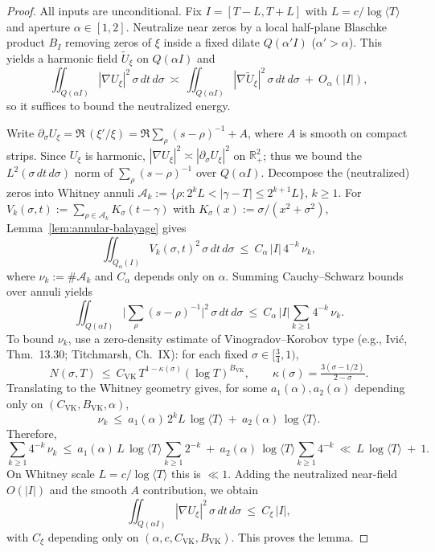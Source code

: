 \documentclass[11pt]{article}
\theoremstyle{definition}
\theoremstyle{remark}
\newcommand{\R}{\mathbb{R}}
\begin{document}
\begin{proof}
All inputs are unconditional. Fix $I=[T-L,T+L]$ with $L=c/\log\langle T\rangle$ and aperture $\alpha\in[1,2]$. Neutralize near zeros by a local half-plane Blaschke product $B_I$ removing zeros of $\xi$ inside a fixed dilate $Q(\alpha'I)$ ($\alpha'>\alpha$). This yields a harmonic field $\widetilde U_\xi$ on $Q(\alpha I)$ and
\[
  \iint_{Q(\alpha I)} |\nabla U_\xi|^2\,\sigma\,dt\,d\sigma\ \asymp\ \iint_{Q(\alpha I)} |\nabla \widetilde U_\xi|^2\,\sigma\,dt\,d\sigma\ +\ O_\alpha(|I|),
\]
so it suffices to bound the neutralized energy.

Write $\partial_\sigma U_\xi=\Re\,(\xi'/\xi)=\Re\sum_\rho (s-\rho)^{-1}+A$, where $A$ is smooth on compact strips. Since $U_\xi$ is harmonic, $|\nabla U_\xi|^2\asymp |\partial_\sigma U_\xi|^2$ on $\R^2_+$; thus we bound the $L^2(\sigma\,dt\,d\sigma)$ norm of $\sum_\rho (s-\rho)^{-1}$ over $Q(\alpha I)$. Decompose the (neutralized) zeros into Whitney annuli $\mathcal A_k:=\{\rho:2^kL<|\gamma-T|\le 2^{k+1}L\}$, $k\ge1$. For $V_k(\sigma,t):=\sum_{\rho\in\mathcal A_k} K_\sigma(t-\gamma)$ with $K_\sigma(x):=\sigma/(x^2+\sigma^2)$, Lemma~\ref{lem:annular-balayage} gives
\[
  \iint_{Q_\alpha(I)} V_k(\sigma,t)^2\,\sigma\,dt\,d\sigma\ \le\ C_\alpha\,|I|\,4^{-k}\,\nu_k,
\]
where $\nu_k:=\#\mathcal A_k$ and $C_\alpha$ depends only on $\alpha$. Summing Cauchy–Schwarz bounds over annuli yields
\[
  \iint_{Q(\alpha I)} \Big|\sum_{\rho}(s-\rho)^{-1}\Big|^2\,\sigma\,dt\,d\sigma\ \le\ C_\alpha\,|I|\sum_{k\ge1}4^{-k}\,\nu_k.
\]
To bound $\nu_k$, use a zero-density estimate of Vinogradov–Korobov type (e.g., Ivi\'c, Thm.~13.30; Titchmarsh, Ch.~IX): for each fixed $\sigma\in[\tfrac34,1)$,
\[
  N(\sigma,T)\ \le\ C_{\mathrm{VK}}\,T^{1-\kappa(\sigma)}(\log T)^{B_{\mathrm{VK}}},\qquad \kappa(\sigma)=\tfrac{3(\sigma-1/2)}{2-\sigma}.
\]
Translating to the Whitney geometry gives, for some $a_1(\alpha),a_2(\alpha)$ depending only on $(C_{\mathrm{VK}},B_{\mathrm{VK}},\alpha)$,
\[
  \nu_k\ \le\ a_1(\alpha)\,2^k L\,\log\langle T\rangle\ +\ a_2(\alpha)\,\log\langle T\rangle.
\]
Therefore,
\[
  \sum_{k\ge1}4^{-k}\,\nu_k\ \le\ a_1(\alpha)\,L\,\log\langle T\rangle\sum_{k\ge1}2^{-k}\ +\ a_2(\alpha)\,\log\langle T\rangle\sum_{k\ge1}4^{-k}\ \ll\ L\,\log\langle T\rangle\ +\ 1.
\]
On Whitney scale $L=c/\log\langle T\rangle$ this is $\ll 1$. Adding the neutralized near-field $O(|I|)$ and the smooth $A$ contribution, we obtain
\[
  \iint_{Q(\alpha I)} |\nabla U_\xi|^2\,\sigma\,dt\,d\sigma\ \le\ C_\xi\,|I|,
\]
with $C_\xi$ depending only on $(\alpha,c,C_{\mathrm{VK}},B_{\mathrm{VK}})$. This proves the lemma.
\end{proof}
\end{document}
